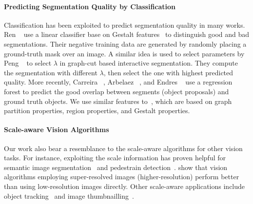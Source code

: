 
\paragraph{Predicting Segmentation Quality by Classification}
Classification has been exploited to predict segmentation quality in many works.
Ren \etal~\cite{ren2003learning} use a linear classifier base on Gestalt features~\cite{palmer1999vision}
to distinguish good and bad segmentations.
Their negative training data are generated by randomly placing a ground-truth mask over an image.
A similar idea is used to select parameters by Peng \etal~\cite{peng2008parameter} to select $\lambda$ in 
graph-cut based interactive segmentation.
They compute the segmentation with different $\lambda$, then select the one with highest predicted quality. 
More recently, Carreira \etal~\cite{carreira2010constrained}, Arbelaez \etal~\cite{arbelaez2014multiscale},
and Endres \etal~\cite{endres2014category} use a regression forest to predict the good overlap between
segments (object proposals) and ground truth objects.
We use similar features to~\cite{carreira2010constrained}, which are based on graph partition properties,
region properties, and Gestalt properties.

   
\paragraph{Scale-aware Vision Algorithms} 
Our work also bear a resemblance to the scale-aware algorithms for other vision tasks. 
For instance, exploiting the scale information has proven helpful for semantic image segmentation~\cite{chen2015attention} and 
pedestrain detection~\cite{li2015scale}. \cite{SR4VTs:wacv16} show that 
vision algorithms employing super-resolved images (higher-resolution) perform better than using low-resolution images directly.  
Other scale-aware applications include object tracking~\cite{Klodt2013} and image thumbnailling~\cite{Sun2013}.     
   
   
   
   
   